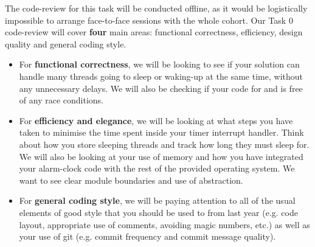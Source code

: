 \documentclass[a4paper,11pt]{article}
\begin{document}
The code-review for this task will be conducted offline, as it would be logistically
impossible to arrange face-to-face sessions with the whole cohort.
Our Task 0 code-review will cover \textbf{four} main areas: 
functional correctness, efficiency, design quality and general coding style.

\begin{itemize}
  \item For \textbf{functional correctness}, we will be looking to see if your solution can handle many threads going to sleep or waking-up at the same time, without any unnecessary delays. 
  We will also be checking if your code for  and  is free of any race conditions.
    
  \item For \textbf{efficiency and elegance}, we will be looking at what steps you have taken to minimise the time spent inside your timer interrupt handler. Think about how you store sleeping threads and track how long they must sleep for. We will also be looking at your use of memory and how you have integrated your alarm-clock code with the rest of the provided operating system. We want to see clear module boundaries and use of abstraction.
 
  \item For \textbf{general coding style}, we will be paying attention to all of the usual elements of good style that you should be used to from last year (e.g. code layout, appropriate use of comments, avoiding magic numbers, etc.) as well as your use of git (e.g. commit frequency and commit message quality).
\end{itemize}











\end{document}

